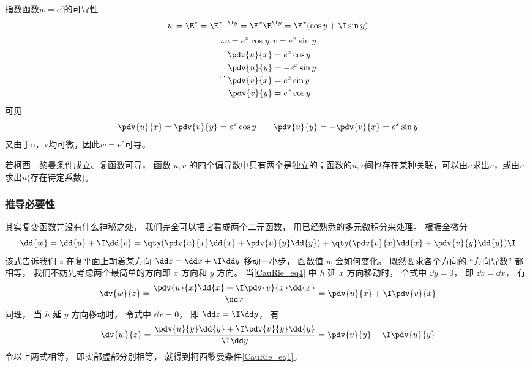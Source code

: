 \begin{example}{指数函数$w=e^z$的可导性}
$$w = \E^z = \E^{x + \I y} = \E^x \E^{\I y}=\E^x(\cos y + \I\sin y)$$
$$\therefore u=e^x\cos y, v = e^x\sin y$$
$$
\therefore
\begin{aligned}
\pdv{u}{x} &= e^x\cos y\\
\pdv{u}{y} &= -e^x\sin y\\
\pdv{v}{x} &= e^x\sin y\\
\pdv{v}{y} &= e^x\cos y\\
\end{aligned}
$$
可见
\begin{equation}
\pdv{u}{x} = \pdv{v}{y}= e^x\cos y \qquad
\pdv{u}{y} = - \pdv{v}{x}= e^x\sin y
\end{equation}
又由于u，v均可微，因此$w=e^z$可导。
\end{example}

若柯西—黎曼条件成立、复函数可导， 函数 $u,v$ 的四个偏导数中只有两个是独立的；函数的$u,v$间也存在某种关联，可以由$u$求出$v$，或由$v$求出$u$(存在待定系数)。

\subsubsection{推导必要性}
其实复变函数并没有什么神秘之处， 我们完全可以把它看成两个二元函数， 用已经熟悉的多元微积分来处理。 根据全微分
\begin{equation}\label{CauRie_eq2}
\dd{w} = \dd{u} + \I \dd{v} = \qty(\pdv{u}{x} \dd{x} + \pdv{u}{y} \dd{y}) + \qty(\pdv{v}{x} \dd{x} + \pdv{v}{y} \dd{y})\I
\end{equation}
该式告诉我们 $z$ 在复平面上朝着某方向 $\dd z = \dd x + \I \dd y$ 移动一小步， 函数值 $w$ 会如何变化。 既然要求各个方向的 “方向导数” 都相等， 我们不妨先考虑两个最简单的方向即 $x$ 方向和 $y$ 方向。 当\autoref{CauRie_eq4} 中 $h$ 延 $x$ 方向移动时， 令式中 $\dd y = 0$， 即 $\dd z = \dd x$， 有
\begin{equation}
\dv{w}{z} = \frac{\pdv{u}{x} \dd{x} +  \I\pdv{v}{x} \dd{x}}{\dd x} = \pdv{u}{x} +  \I\pdv{v}{x}
\end{equation}
同理， 当 $h$ 延 $y$ 方向移动时， 令式中 $\dd x = 0$， 即 $\dd z = \I\dd y$， 有
\begin{equation}
\dv{w}{z} = \frac{\pdv{u}{y} \dd{y} + \I\pdv{v}{y} \dd{y}}{\I \dd y} = \pdv{v}{y} -\I \pdv{u}{y}
\end{equation}
令以上两式相等， 即实部虚部分别相等， 就得到柯西黎曼条件\autoref{CauRie_eq1}。

